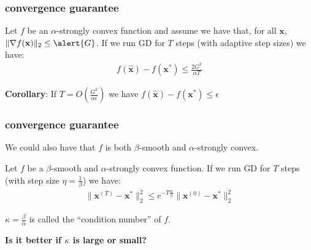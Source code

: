 \documentclass[compress]{beamer}
\newcommand{\bv}[1]{\mathbf{#1}}
\begin{document}
\begin{frame}[t]
	\frametitle{convergence guarantee}
	\begin{theorem}
		Let $f$ be an \alert{$\alpha$}-strongly convex function and assume we have that, for all $\bv{x}$, $\|\nabla f(\bv{x})\|_2 \leq \alert{G}$. If we run GD for $T$ steps (with adaptive step sizes) we have:
		\begin{align*}
			f(\hat{\bv{x}}) - f(\bv{x}^*) \leq \frac{2G^2}{\alpha T} 
		\end{align*} 
	\end{theorem}
	\textbf{Corollary}: If \alert{$T = O\left(\frac{G^2}{\alpha \epsilon}\right)$} we have $f(\hat{\bv{x}}) - f(\bv{x}^*) \leq \epsilon$
\end{frame}


\begin{frame}[t]
	\frametitle{convergence guarantee}
	We could also have that $f$ is both $\beta$-smooth and $\alpha$-strongly convex.
	
	\begin{theorem}
		Let $f$ be a $\beta$-smooth and $\alpha$-strongly convex function. If we run GD for $T$ steps (with step size $\eta = \frac{1}{\beta}$) we have:
		\begin{align*}
			\|\bv{x}^{(T)} - \bv{x}^*\|_2^2 \leq e^{-T \frac{\alpha}{\beta}} \|\bv{x}^{(0)} - \bv{x}^*\|_2^2
		\end{align*} 
	\end{theorem}	
	\begin{center}
		\alert{$\kappa = \frac{\beta}{\alpha}$} is called the ``condition number'' of $f$. 
		
		\textbf{Is it better if $\kappa$ is large or small?}
	\end{center}
\end{frame}

\end{document}
